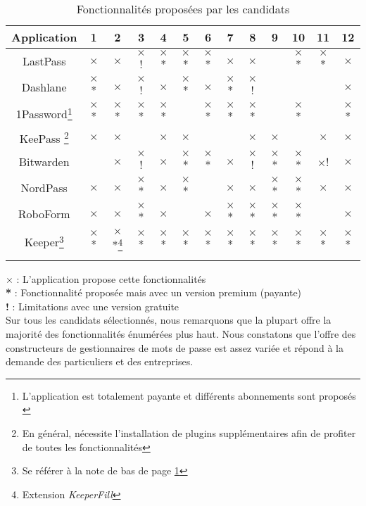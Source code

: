 \begin{longtable}[h]{|c|c|c|c|c|c|c|c|c|c|c|c|c|}
	\hline
	Application & 1 & 2 & 3 & 4 & 5 & 6 & 7 & 8 & 9 & 10 & 11 & 12 \\
	\hline
	LastPass & $\times$ & $\times$ & $\times$! & $\times$* & $\times$* &  $\times$*& $\times$ & $\times$ & & $\times$* & $\times$* & $\times$ \\
		\hline
	Dashlane & $\times$* & $\times$ & $\times$! & $\times$ & $\times$* & $\times$ & $\times$* & $\times$! & & & & $\times$ \\
		\hline
	1Password\footnote{L'application est totalement payante et différents abonnements sont proposés \label{1p}} & $\times$* & $\times$* & $\times$* & $\times$* & & $\times$* & $\times$* & $\times$* & & $\times$* & & $\times$* \\
			\hline
	KeePass \footnote{En général, nécessite l'installation de plugins supplémentaires afin de profiter de toutes les fonctionnalités} & $\times$ & $\times$ &  & $\times$ & $\times$ & & & $\times$ & $\times$ & & $\times$ & $\times$\\
		\hline
	Bitwarden &  & $\times$  & $\times$! & $\times$ & $\times$* & $\times$* & $\times$ & $\times$! & $\times$* &  $\times$* & $\times$!& $\times$ \\
	\hline
	NordPass & $\times$ & $\times$ & $\times$*  & $\times$ & $\times$* & & $\times$ & $\times$ & $\times$* & $\times$* & $\times$ & $\times$\\
	\hline
	RoboForm & $\times$ & $\times$ & $\times$* & $\times$ & & $\times$ & $\times$* & $\times$* & $\times$* & $\times$* & & $\times$\\
	\hline
	Keeper\footnote{Se référer à la note de bas de page \ref{1p}} & $\times$* & $\times$*\footnote{Extension \textit{KeeperFill}} & $\times$* & $\times$* &$\times$* & $\times$* & $\times$* &$\times$* &$\times$* & $\times$* & $\times$* &  $\times$* \\
	\hline
	\caption{Fonctionnalités proposées par les candidats}
\end{longtable} 
$\times$ : L'application propose cette fonctionnalités \\
\textbf{*}\hspace{0.1cm} : Fonctionnalité proposée mais avec un version premium (payante) \\
\textbf{!}\hspace{0.18cm} : Limitations avec une version gratuite \\

Sur tous les candidats sélectionnés, nous remarquons que la plupart offre la majorité des fonctionnalités énumérées plus haut. Nous constatons que l'offre des constructeurs de gestionnaires de mots de passe est assez variée et répond à la demande des particuliers et des entreprises.
